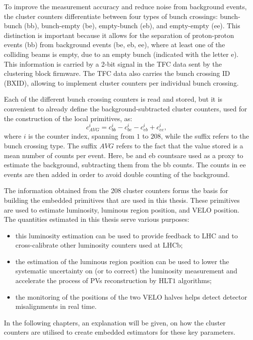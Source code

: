 To improve the measurement accuracy and reduce noise from background events, the cluster counters differentiate between four types of bunch crossings: bunch-bunch (bb), bunch-empty (be), empty-bunch (eb), and empty-empty (ee). This distinction is important because it allows for the separation of proton-proton events (bb) from background events (be, eb, ee), where at least one of the colliding beams is empty, due to an empty bunch (indicated with the letter e). This information is carried by a 2-bit signal in the TFC data sent by the clustering block firmware. The TFC data also carries the bunch crossing ID (BXID), allowing to implement cluster counters per individual bunch crossing.

Each of the different bunch crossing counters is read and stored, but it is convenient to already define the background-subtracted cluster counters, used for the construction of the local primitives, as: 
\begin{equation}
    c^i_{AVG} = c^i_{bb} - c^i_{be} - c^i_{eb} + c^i_{ee},
\end{equation}
where $i$ is the counter index, spanning from $1$ to $208$, while the suffix refers to the bunch crossing type. The suffix $AVG$ refers to the fact that the value stored is a mean number of counts per event.
Here, be and eb countsare used as a proxy to estimate the background, subtracting them from the bb counts. The counts in ee events are then added in order to avoid double counting of the background.

The information obtained from the 208 cluster counters forms the basis for building the embedded primitives that are used in this thesis. These primitives are used to estimate luminosity, luminous region position, and VELO position. The quantities estimated in this thesis serve various purposes:
\begin{itemize}
    \item this luminosity estimation can be used to provide feedback to LHC and to cross-calibrate other luminosity counters used at LHCb;
    \item the estimation of the luminous region position can be used to lower the systematic uncertainty on (or to correct) the luminosity measurement and accelerate the process of PVs reconstruction by HLT$1$ algorithms;
    \item the monitoring of the positions of the two VELO halves helps detect detector misalignments in real time.
\end{itemize}

In the following chapters, an explanation will be given, on how the cluster counters are utilised to create embedded estimators for these key parameters. 

